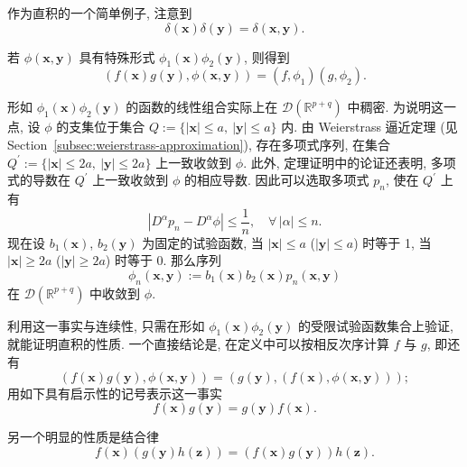 \begin{Example}
\label{ex:direct-product-delta}
作为直积的一个简单例子, 注意到 \[\delta(\bm{x})\delta(\bm{y})=\delta(\bm{x},\bm{y}).\]
\end{Example}

若 $\phi(\bm{x},\bm{y})$ 具有特殊形式 $\phi_1(\bm{x})\phi_2(\bm{y})$, 则得到
\begin{equation}\label{eq:direct-product-separable-test-pairing}
(f(\bm{x})g(\bm{y}),\phi(\bm{x},\bm{y}))=(f,\phi_1)(g,\phi_2).
\end{equation}


形如 $\phi_1(\bm{x})\phi_2(\bm{y})$ 的函数的线性组合实际上在 $\mathcal{D}(\mathbb{R}^{p+q})$ 中稠密. 为说明这一点, 设 $\phi$ 的支集位于集合 $Q:=\{|\bm{x}|\leq a,\ |\bm{y}|\leq a\}$ 内. 由 Weierstrass 逼近定理 (见 Section~\ref{subsec:weierstrass-approximation}), 存在多项式序列, 在集合 $Q^{\prime}:=\{|\bm{x}|\leq2a,\ |\bm{y}|\leq2a\}$ 上一致收敛到 $\phi$. 此外, 定理证明中的论证还表明, 多项式的导数在 $Q^{\prime}$ 上一致收敛到 $\phi$ 的相应导数. 因此可以选取多项式 $p_n$, 使在 $Q^{\prime}$ 上有
\begin{equation}\label{eq:direct-product-polynomial-derivative-approximation}
|D^\alpha p_n-D^\alpha\phi|\leq\dfrac1n,\quad\forall\,|\alpha|\leq n.
\end{equation}
现在设 $b_1(\bm{x})$, $b_2(\bm{y})$ 为固定的试验函数, 当 $|\bm{x}|\leq a$ ($|\bm{y}|\leq a$) 时等于 1, 当 $|\bm{x}|\geq2a$ ($|\bm{y}|\geq2a$) 时等于 0. 那么序列
\begin{equation}\label{eq:direct-product-cutoff-polynomial-approximation}
\phi_n(\bm{x},\bm{y}):=b_1(\bm{x})b_2(\bm{x})p_n(\bm{x},\bm{y})
\end{equation}
在 $\mathcal{D}(\mathbb{R}^{p+q})$ 中收敛到 $\phi$.

利用这一事实与连续性, 只需在形如 $\phi_1(\bm{x})\phi_2(\bm{y})$ 的受限试验函数集合上验证, 就能证明直积的性质. 一个直接结论是, 在定义中可以按相反次序计算 $f$ 与 $g$, 即还有
\begin{equation}\label{eq:direct-product-reversed-pairing}
(f(\bm{x})g(\bm{y}),\phi(\bm{x},\bm{y}))=(g(\bm{y}),(f(\bm{x}),\phi(\bm{x},\bm{y})));
\end{equation}
用如下具有启示性的记号表示这一事实
\begin{equation}\label{eq:distribution-direct-product-commutativity}
f(\bm{x})g(\bm{y})=g(\bm{y})f(\bm{x}).
\end{equation}


另一个明显的性质是结合律
\begin{equation}\label{eq:distribution-direct-product-associativity}
f(\bm{x})(g(\bm{y})h(\bm{z}))=(f(\bm{x})g(\bm{y}))h(\bm{z}).
\end{equation}

